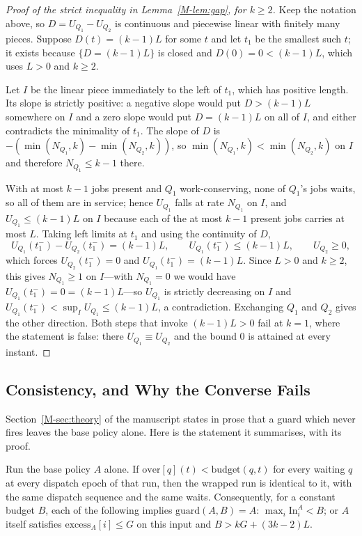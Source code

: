 \documentclass[mathematics,supfile,submit,moreauthors]{Definitions/mdpi}
\begin{document}
\begin{proof}[Proof of the strict inequality in Lemma~\ref*{M-lem:gap}, for $k \ge 2$]
Keep the notation above, so $D = U_{Q_1} - U_{Q_2}$ is continuous and piecewise
linear with finitely many pieces. Suppose $D(t) = (k-1)L$ for some $t$ and let
$t_1$ be the smallest such $t$; it exists because $\{D = (k-1)L\}$ is closed and
$D(0) = 0 < (k-1)L$, which uses $L > 0$ and $k \ge 2$.

Let $I$ be the linear piece immediately to the left of $t_1$, which has positive
length. Its slope is strictly positive: a negative slope would put
$D > (k-1)L$ somewhere on $I$ and a zero slope would put $D = (k-1)L$ on all of
$I$, and either contradicts the minimality of $t_1$. The slope of $D$ is
$-(\min(N_{Q_1},k) - \min(N_{Q_2},k))$, so $\min(N_{Q_1},k) < \min(N_{Q_2},k)$
on $I$ and
therefore $N_{Q_1} \le k-1$ there.

With at most $k-1$ jobs present and $Q_1$ work-conserving, none of $Q_1$'s jobs
waits, so all of them are in service; hence $U_{Q_1}$ falls at rate $N_{Q_1}$ on
$I$,
and $U_{Q_1} \le (k-1)L$ on $I$ because each of the at most $k-1$ present jobs
carries at most $L$. Taking left limits at $t_1$ and using the continuity of
$D$,
\[
  U_{Q_1}(t_1^-) - U_{Q_2}(t_1^-) = (k-1)L , \qquad U_{Q_1}(t_1^-) \le (k-1)L ,
  \qquad U_{Q_2} \ge 0 ,
\]
which forces $U_{Q_2}(t_1^-) = 0$ and $U_{Q_1}(t_1^-) = (k-1)L$. Since $L > 0$
and $k \ge 2$, this
gives $N_{Q_1} \ge 1$ on $I$---with $N_{Q_1} = 0$ we would have
$U_{Q_1}(t_1^-) = 0 = (k-1)L$---so $U_{Q_1}$ is strictly decreasing on $I$ and
$U_{Q_1}(t_1^-) < \sup_I U_{Q_1} \le (k-1)L$, a contradiction. Exchanging $Q_1$
and $Q_2$ gives the other direction. Both steps that invoke $(k-1)L > 0$ fail at
$k = 1$, where the statement is false: there $U_{Q_1} \equiv U_{Q_2}$ and the
bound $0$ is attained at every instant.
\end{proof}

\subsection{Consistency, and Why the Converse Fails}
\label{sec:supp_consistency}

Section~\ref*{M-sec:theory} of the manuscript states in prose that a guard which never fires leaves the
base policy alone. Here is the statement it summarises, with its proof.

\begin{proposition}
\label{prop:consistency}
Run the base policy $A$ alone. If $\mathrm{over}[q](t) < \mathrm{budget}(q,t)$
for every waiting $q$ at every dispatch epoch of that run, then the wrapped run
is identical to it, with the same dispatch sequence and the same waits.
Consequently, for a constant budget $B$, each of the following implies
$\text{guard}(A,B) = A$: $\max_i \mathrm{In}^A_i < B$; or $A$ itself satisfies
$\mathrm{excess}_A[i] \le G$ on this input and $B > kG + (3k-2)L$.
\end{proposition}
\end{document}
